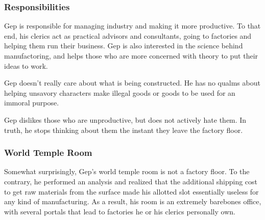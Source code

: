 \subsubsection*{Responsibilities}
Gep is responsible for managing industry and making it more productive.
To that end, his clerics act as practical advisors and consultants, going to factories and helping them run their business.
Gep is also interested in the science behind manufactoring, and helps those who are more concerned with theory to put their ideas to work.

Gep doesn't really care about what is being constructed.
He has no qualms about helping unsavory characters make illegal goods or goods to be used for an immoral purpose.

Gep dislikes those who are unproductive, but does not actively hate them.
In truth, he stops thinking about them the instant they leave the factory floor. 

\subsubsection*{World Temple Room}
Somewhat surprisingly, Gep's world temple room is not a factory floor.
To the contrary, he performed an analysis and realized that the additional shipping cost to get raw materials from the surface made his allotted slot essentially useless for any kind of manufacturing.
As a result, his room is an extremely barebones office, with several portals that lead to factories he or his clerics personally own.

